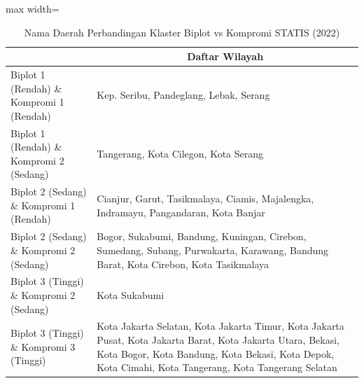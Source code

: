 \begin{table}[H]
\centering
\caption{Nama Daerah Perbandingan Klaster Biplot vs Kompromi STATIS (2022)} \label{tab:app2biplot_comp_name_2022}
\begin{adjustbox}{max width=\textwidth}
\begin{tabular}{|>{\centering\arraybackslash}p{4cm}|p{10cm}|}
\hline
\multicolumn{1}{|c|}{\textbf{Kategori}} & \multicolumn{1}{c|}{\textbf{Daftar Wilayah}} \\
\hline
Biplot 1 (Rendah) \& Kompromi 1 (Rendah) & Kep. Seribu, Pandeglang, Lebak, Serang \\
\hline
Biplot 1 (Rendah) \& Kompromi 2 (Sedang) & Tangerang, Kota Cilegon, Kota Serang \\
\hline
Biplot 2 (Sedang) \& Kompromi 1 (Rendah) & Cianjur, Garut, Tasikmalaya, Ciamis, Majalengka, Indramayu, Pangandaran, Kota Banjar \\
\hline
Biplot 2 (Sedang) \& Kompromi 2 (Sedang) & Bogor, Sukabumi, Bandung, Kuningan, Cirebon, Sumedang, Subang, Purwakarta, Karawang, Bandung Barat, Kota Cirebon, Kota Tasikmalaya \\
\hline
Biplot 3 (Tinggi) \& Kompromi 2 (Sedang) & Kota Sukabumi \\
\hline
Biplot 3 (Tinggi) \& Kompromi 3 (Tinggi) & Kota Jakarta Selatan, Kota Jakarta Timur, Kota Jakarta Pusat, Kota Jakarta Barat, Kota Jakarta Utara, Bekasi, Kota Bogor, Kota Bandung, Kota Bekasi, Kota Depok, Kota Cimahi, Kota Tangerang, Kota Tangerang Selatan \\
\hline
\end{tabular}
\end{adjustbox}
\end{table}